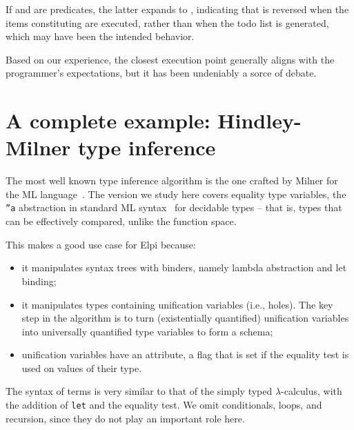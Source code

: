 \documentclass[a4paper, 11pt]{book}
\begin{document}
If  and  are predicates, the latter expands to
, indicating that  is reversed when
the items constituting  are executed, rather than when
the todo list is generated, which may have been the intended behavior.

Based on our experience, the closest execution point generally aligns with
the programmer's expectations, but it has been undeniably a sorce of debate.

\section{A complete example: Hindley-Milner type inference}\label{sec:milner}

The most well known type inference algorithm is the one crafted by Milner
for the ML language~\cite{MILNER1978348}. The version we study here covers
equality type variables, the \texttt{''a} abstraction in standard ML syntax~\cite{10.7551/mitpress/2319.001.0001}
for decidable types -- that is, types that can be effectively compared, unlike
the function space.

This makes a good use case for Elpi because:
\begin{itemize}
  \item it manipulates syntax trees with binders, namely lambda abstraction
    and let binding;
  \item it manipulates types containing unification variables (i.e., holes).
    The key step in the algorithm is to turn (existentially quantified)
    unification variables into universally quantified type variables to form a
    schema;
  \item unification variables have an attribute, a flag
    that is set if the equality test is used on values of their type.
\end{itemize}

The syntax of terms is very similar to that of the simply typed
$\lambda$-calculus, with the addition of \texttt{let} and the equality test.
We omit conditionals, loops, and recursion, since they do not play an
important role here.
\end{document}

